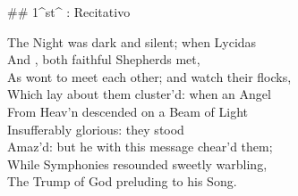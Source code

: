 \newpage
{}

## 1^st^ \mvmt: Recitativo

\begin{linenumbers}
The Night was dark and silent; when Lycidas  \\
And , both faithful Shepherds met,  \\
As wont to meet each other; and watch their flocks,  \\
Which lay about them cluster’d: when an Angel  \\
From Heav’n descended on a Beam of Light  \\
Insufferably glorious: they stood  \\
Amaz’d: but he with this message chear’d them;  \\
While Symphonies resounded sweetly warbling,  \\
The Trump of God preluding to his Song.
\end{linenumbers}
